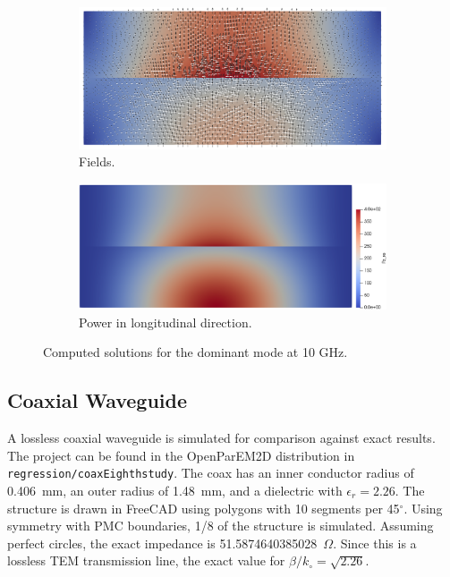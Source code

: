 \documentclass[titlepage]{article}
\renewcommand\_{\textunderscore\linebreak[1]}
\begin{document}
\begin{figure}[H]
  \centering
  \begin{subfigure}{0.429\textwidth}
     \includegraphics[width=\linewidth]{../regression/OpenParEM2D/partially_filled_rect_waveguide/PartFilled_order_6_study/screenshots/partial_field}
     \caption{Fields.}
  \end{subfigure}
  \begin{subfigure}{0.471\textwidth}
     \includegraphics[width=\linewidth]{../regression/OpenParEM2D/partially_filled_rect_waveguide/PartFilled_order_6_study/screenshots/partial_power}
     \caption{Power in longitudinal direction.}
  \end{subfigure}
  \caption{Computed solutions for the dominant mode at 10 GHz.}
  \label{fig:partial_field_power}
\end{figure}

\subsection{Coaxial Waveguide}

A lossless coaxial waveguide is simulated for comparison against exact results.  The project can be found in the OpenParEM2D distribution in \texttt{regression/coaxEighth\_study}.  The coax has an inner conductor radius of 0.406~mm, an outer radius of 1.48~mm, and a dielectric with $\epsilon_r=2.26$.  The structure is drawn in FreeCAD using polygons with 10 segments per 45$^{\circ}$. Using symmetry with PMC boundaries, 1/8 of the structure is simulated.  Assuming perfect circles, the exact impedance is 51.5874640385028~$\Omega$.  Since this is a lossless TEM transmission line, the exact value for $\beta/k_{\circ}=\sqrt{2.26}$.
\end{document}

